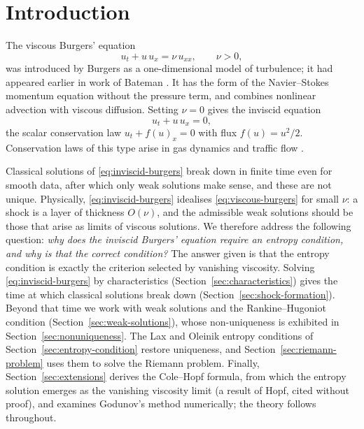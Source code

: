 
\section{Introduction}
\label{sec:motivation}

The viscous Burgers' equation
\begin{equation}
  \label{eq:viscous-burgers}
  u_t + u\,u_x = \nu\,u_{xx}, \qquad \nu>0,
\end{equation}
was introduced by Burgers \cite{burgers1948} as a one-dimensional model of
turbulence; it had appeared earlier in work of Bateman \cite{bateman1915}. It
has the form of the Navier--Stokes momentum equation without the pressure term,
and combines nonlinear advection with viscous diffusion. Setting $\nu=0$ gives
the inviscid equation
\begin{equation}
  \label{eq:inviscid-burgers}
  u_t + u\,u_x = 0,
\end{equation}
the scalar conservation law $u_t+f(u)_x=0$ with flux $f(u)=u^2/2$. Conservation
laws of this type arise in gas dynamics \cite{evans2010,leveque2002} and traffic flow \cite{lighthill1955}.

Classical solutions of \eqref{eq:inviscid-burgers} break down in finite time
even for smooth data, after which only weak solutions make sense, and these are
not unique. Physically, \eqref{eq:inviscid-burgers} idealises
\eqref{eq:viscous-burgers} for small $\nu$: a shock is a layer of thickness
$O(\nu)$, and the admissible weak solutions should be those that arise as
limits of viscous solutions. We therefore address the following question:
\emph{why does the inviscid Burgers' equation require an entropy condition, and
why is that the correct condition?} The answer given is that the entropy
condition is exactly the criterion selected by vanishing viscosity. Solving \eqref{eq:inviscid-burgers} by characteristics
(Section~\ref{sec:characteristics}) gives the time at which classical solutions
break down (Section~\ref{sec:shock-formation}). Beyond that time we work with
weak solutions and the Rankine--Hugoniot condition
(Section~\ref{sec:weak-solutions}), whose non-uniqueness is exhibited in
Section~\ref{sec:nonuniqueness}. The Lax and Oleinik entropy conditions of
Section~\ref{sec:entropy-condition} restore uniqueness, and
Section~\ref{sec:riemann-problem} uses them to solve the Riemann problem.
Finally, Section~\ref{sec:extensions} derives the Cole--Hopf formula, from which
the entropy solution emerges as the vanishing viscosity limit (a result of Hopf,
cited without proof), and examines Godunov's method numerically; the theory follows
\cite[\S3.4]{evans2010} throughout.

